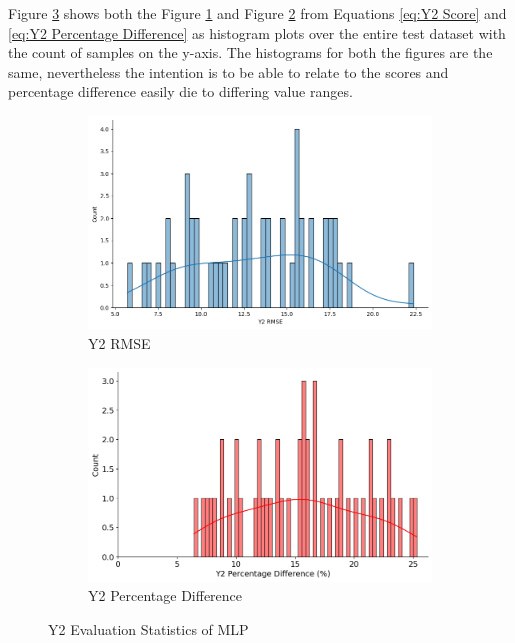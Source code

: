 \documentclass{report} %
\begin{document}
Figure \ref{fig:Y2 Evaluation Statistics MLP} shows both the Figure \ref{fig:Y2 RMSE} and Figure \ref{fig:Y2 Percentage Difference} from Equations \ref{eq:Y2 Score} 
and \ref{eq:Y2 Percentage Difference} as histogram plots over the entire test dataset with the count of samples on the y-axis.
The histograms for both the figures are the same, nevertheless the intention is to be able to relate to the scores and percentage difference easily die to differing 
value ranges.
\begin{figure}[H]
    \centering
    \begin{subfigure}{0.5\textwidth}
        \centering
        \includegraphics[width=\textwidth]{./ReportImages/score_MLP_y2.png}
        \caption{Y2 \ac{RMSE}}
        \label{fig:Y2 RMSE}
    \end{subfigure}\hfill
    \begin{subfigure}{0.5\textwidth}
        \centering
        \includegraphics[width=\textwidth]{./ReportImages/percentage_diff_MLP_y2.png}
        \caption{Y2 Percentage Difference}
        \label{fig:Y2 Percentage Difference}
    \end{subfigure}
    \caption{Y2 Evaluation Statistics of \ac{MLP}}
    \label{fig:Y2 Evaluation Statistics MLP}
\end{figure}
\end{document}
